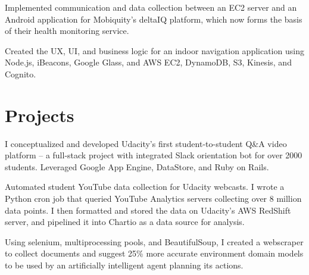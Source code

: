 \documentclass[]{deedy-resume-openfont}
\begin{document}
\begin{minipage}[t]{0.66\textwidth}
\begin{tightemize}
\item Implemented communication and data collection between an EC2 server and an Android application for Mobiquity’s deltaIQ platform, which now forms the basis of their health monitoring service.

\item Created the UX, UI, and business logic for an indoor navigation application using Node.js, iBeacons, Google Glass, and AWS EC2, DynamoDB, S3, Kinesis, and Cognito.
\end{tightemize}


\section{Projects}

\begin{tightemize}
\item I conceptualized and developed Udacity's first student-to-student Q\&A video platform -- a full-stack project with integrated Slack orientation bot for over 2000 students. Leveraged Google App Engine, DataStore, and Ruby on Rails.
\end{tightemize}
\sectionsep

\begin{tightemize}
\item Automated student YouTube data collection for Udacity webcasts. I wrote a Python cron job that queried YouTube Analytics servers collecting over 8 million data points. I then formatted and stored the data on Udacity's AWS RedShift server, and pipelined it into Chartio as a data source for analysis.
\end{tightemize}
\sectionsep

\begin{tightemize}
\item Using selenium, multiprocessing pools, and BeautifulSoup, I created a webscraper to collect documents and suggest 25\% more accurate environment domain models to be used by an artificially intelligent agent planning its actions. 
\end{tightemize}
\sectionsep


\end{minipage}
\end{document}
